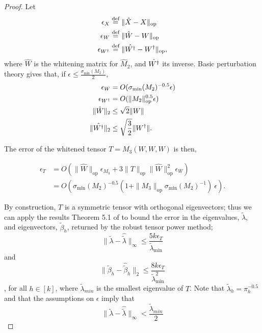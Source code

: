 \documentclass[tablecaption=bottom]{jmlr}
\newcommand\eqdef{\ensuremath{\stackrel{\textrm{def}}{=}}} %
\newcommand\sigmamin{\sigma_\textrm{min}}
\newcommand{\Lop}{\textrm{op}}
\begin{document}
\begin{proof}
Let 
\begin{align}
\epsilon_{X} &\eqdef \|\hat X - X\|_\Lop \\
\epsilon_W &\eqdef \|\hat W - W\|_\Lop \\
\epsilon_{\Winv} &\eqdef \|\hat \Winv - \Winv\|_\Lop,
\end{align}
where $\hat W$ is the whitening
matrix for $\hat M_2$, and $\hat {W^{\dagger}}$ its inverse. 
Basic perturbation theory gives that, if $\epsilon \le \frac{\sigmamin(M_2)}{2}$,
\begin{align}
\epsilon_W &= O(\sigmamin(M_2)^{-0.5} \epsilon) \\
\epsilon_{\Winv} &= O(\|M_2\|_\Lop^{0.5} \epsilon) \\
\|\hat W\|_2 &\le \sqrt{2} \|W\| \\
\|\hat \Winv\|_2 &\le \sqrt\frac{3}{2} \|\Winv\|.
\end{align}

The error of the whitened tensor $T = M_3(W,W,W)$ is then, 

\begin{align}
\epsilon_T &= O\left( \|\hat W\|_\Lop \epsilon_{M_3} + 3 \|T\|_\Lop \|\hat W\|_\Lop^2 \epsilon_{W} \right )  \\
  &= O\left(\sigmamin(M_2)^{-0.5} (1 + \|M_3\|_\Lop \sigmamin(M_2)^{-1} )~\epsilon\right).
\end{align}

By construction, $T$ is a symmetric tensor with orthogonal eigenvectors;
thus we can apply the results Theorem 5.1 of \citet{AnandkumarGeHsu2012}
to bound the error in the eigenvalues, $\tilde \lambda$, and eigenvectors, $\tilde \beta_h$, returned by the
robust tensor power method; 
$$\|\tilde \lambda - \hat {\tilde \lambda} \|_{\infty} \le \frac{5 k \epsilon_T}{\tilde \lambda_{\min}}$$
and
$$\|\tilde \beta_h - \hat {\tilde \beta}_h \|_2 \le \frac{8 k \epsilon_T}{\tilde \lambda_{\min}^2}$$,
for all $h \in [k]$, where $\tilde \lambda_{min}$ is the smallest
eigenvalue of $T$. Note that $\tilde \lambda_h = \pi_h^{-0.5}$ and that
the assumptions on $\epsilon$ imply that $$\|\tilde \lambda - \hat
{\tilde \lambda} \|_{\infty} < \frac{\tilde \lambda_{min}}{2}$$


\end{proof}
\end{document}
